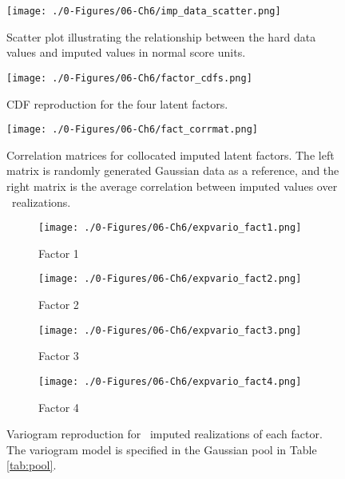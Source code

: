 \begin{figure}[htb!]
    \centering
    \texttt{[image: ./0-Figures/06-Ch6/imp\_data\_scatter.png]}
    \caption{Scatter plot illustrating the relationship between the hard data values and imputed values in normal score units. }
    \label{fig:imp_data_scatter}
\end{figure}

\begin{figure}[htb!]
    \centering
    \texttt{[image: ./0-Figures/06-Ch6/factor\_cdfs.png]}
    \caption{\Gls{CDF} reproduction for the four latent factors. }
    \label{fig:factor_cdfs}
\end{figure}

\begin{figure}[htb!]
    \centering
    \texttt{[image: ./0-Figures/06-Ch6/fact\_corrmat.png]}
    \caption{Correlation matrices for collocated imputed latent factors. The left matrix is randomly generated Gaussian data as a reference, and the right matrix is the average correlation between imputed values over \csnreals \ realizations.}
    \label{fig:fact_corrmat}
\end{figure}

\begin{figure}
    \begin{subfigure}{1.0\textwidth}
        \centering
        \texttt{[image: ./0-Figures/06-Ch6/expvario\_fact1.png]}
        \caption{Factor 1}
    \end{subfigure}
    \begin{subfigure}{1.0\textwidth}
        \centering
        \texttt{[image: ./0-Figures/06-Ch6/expvario\_fact2.png]}
        \caption{Factor 2}
    \end{subfigure}
    \begin{subfigure}{1.0\textwidth}
        \centering
        \texttt{[image: ./0-Figures/06-Ch6/expvario\_fact3.png]}
        \caption{Factor 3}
    \end{subfigure}
    \begin{subfigure}{1.0\textwidth}
        \centering
        \texttt{[image: ./0-Figures/06-Ch6/expvario\_fact4.png]}
        \caption{Factor 4}
    \end{subfigure}
    \caption{Variogram reproduction for \csnreals \ imputed realizations of each factor. The variogram model is specified in the Gaussian pool in Table \ref{tab:pool}.}
    \label{fig:nmrimp_repro_gvario}
\end{figure}


